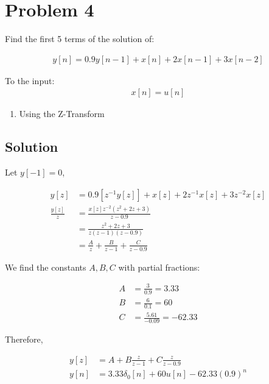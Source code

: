 \section*{Problem 4}

Find the first 5 terms of the solution of:

\begin{equation*}
\begin{aligned}
y[n] = 0.9y[n-1] + x[n] + 2x[n-1] + 3x[n-2]
\end{aligned}
\end{equation*} 

To the input:
\begin{equation*}
\begin{aligned}
x[n]=u[n]
\end{aligned}
\end{equation*} 

\begin{enumerate}
\item Using the Z-Transform
\end{enumerate} 

\subsection*{Solution}

Let $y[-1] = 0$,

\begin{equation*}
\begin{aligned}
y[z] &= 0.9[z^{-1} y[z]] + x[z] + 2z^{-1}x[z] + 3z^{-2}x[z] \\
\frac{y[z]}{z} &= \frac{x[z]z^{-2} (z^2+2z+3)}{z-0.9} \\
&= \frac{z^2+2z+3}{z(z-1)(z-0.9)} \\
&= \frac{A}{z} + \frac{B}{z-1} + \frac{C}{z-0.9}
\end{aligned}
\end{equation*} 

We find the constants $A,B,C$ with partial fractions:

\begin{equation*}
\begin{aligned}
A &= \frac{3}{0.9} = 3.33 \\
B &= \frac{6}{0.1} = 60 \\
C &= \frac{5.61}{-0.09} = -62.33
\end{aligned}
\end{equation*} 

Therefore,

\begin{equation*}
\begin{aligned}
y[z] &= A + B\frac{z}{z-1} + C\frac{z}{z-0.9} \\
y[n] &= 3.33 \delta_0[n] + 60 u[n] - 62.33 (0.9)^n
\end{aligned}
\end{equation*}

